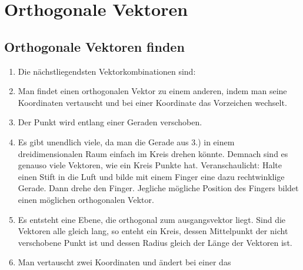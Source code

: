 


\section{Orthogonale Vektoren}
\subsection{Orthogonale Vektoren finden}
\begin{enumerate}
\item Die nächstliegendsten Vektorkombinationen sind:
\item Man findet einen orthogonalen Vektor zu einem anderen, indem man 
  seine Koordinaten vertauscht und bei einer Koordinate das Vorzeichen
  wechselt. 
\item Der Punkt wird entlang einer Geraden verschoben.
\item Es gibt unendlich viele, da man die Gerade aus 3.) in einem
  dreidimensionalen Raum einfach im Kreis drehen könnte. Demnach sind
  es genauso viele Vektoren, wie ein Kreis Punkte
  hat. Veranschaulicht: Halte einen Stift in die Luft und bilde mit
  einem Finger eine dazu rechtwinklige Gerade. Dann drehe den
  Finger. Jegliche mögliche Position des Fingers bildet einen
  möglichen orthogonalen Vektor. 
\item Es entsteht eine Ebene, die orthogonal zum ausgangsvektor
  liegt. Sind die Vektoren alle gleich lang, so enteht ein Kreis,
  dessen Mittelpunkt der nicht verschobene Punkt ist und dessen
  Radius gleich der Länge der Vektoren ist.
\item Man vertauscht zwei Koordinaten und ändert bei einer das

\end{enumerate}
